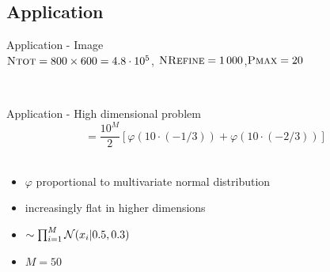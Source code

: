 \documentclass{rsuqbeamernew}
\def\ANIMATE{0}   %
\newcommand{\Ntot}{\textsc{Ntot}}
\newcommand{\Pmax}{\textsc{Pmax}}
\newcommand{\NRefine}{\textsc{NRefine}}
\begin{document}
\subsection{Application}
\begin{frame}[t]{Application - Image}
	\small
	\\
	$\Ntot=800\times 600 = 4.8\cdot 10^5$, $\NRefine=1\,000$,$\Pmax = 20$\\[1em]
	\begin{minipage}{0.49\linewidth}
		\center
		\ifthenelse{\equal{\ANIMATE}{1}}
		{ 
		}
		{
			\raisebox{1.5em}{
			}
		}\\
	\end{minipage}
	\hfill
	\begin{minipage}{0.5\linewidth}
		\center
		\raisebox{1.3em}{
		}
	\end{minipage}
\end{frame}

\begin{frame}[t]{Application - High dimensional problem}
	\small
	\\
	\begin{equation*}
	= \frac{10^M}{2} \left[\varphi(10\cdot(-1/3)) + 
	\varphi(10\cdot(-2/3))\right]
	\end{equation*} 
	\hfill {}\\
	\begin{minipage}{0.49\linewidth}
		\begin{itemize}
			\item $\varphi$ proportional to {\altx multivariate normal 
			distribution}
			\item increasingly flat in higher dimensions
			\item $\sim\prod_{i=1}^M{\mathcal N}(x_i\vert 0.5,0.3)$
			\item {\altx $M=50$}
		\end{itemize}
	\end{minipage}
	\hfill
	\begin{minipage}{0.49\linewidth}
	\end{minipage}
\end{frame}
\end{document}
